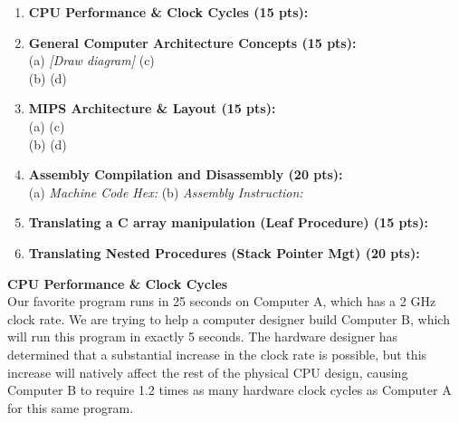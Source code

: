 \documentclass[letterpaper]{report}
\begin{document}
\noindent
\begin{minipage}[t][7in][s]{0.48\textwidth}
\begin{enumerate}[\bf 1.]
    \item \textbf{CPU Performance \& Clock Cycles (15 pts):}
    \vfill
    
    \item \textbf{General Computer Architecture Concepts (15 pts):} \\
    (a) \textit{[Draw diagram]} \hfill (c) \\
    (b) \hfill (d)
    \vfill
    
    \item \textbf{MIPS Architecture \& Layout (15 pts):} \\
    (a) \hfill (c) \\
    (b) \hfill (d)
    \vfill
    
    \item \textbf{Assembly Compilation and Disassembly (20 pts):} \\
    (a) \textit{Machine Code Hex:} \hfill (b) \textit{Assembly Instruction:}
    \vfill
\end{enumerate}
\end{minipage}%
\hfill
\begin{minipage}[t][7in][s]{0.48\textwidth}
\begin{enumerate}[\bf 1.]
\setcounter{enumi}{4}
    \item \textbf{Translating a C array manipulation (Leaf Procedure) (15 pts):}
    \vfill
    
    \item \textbf{Translating Nested Procedures (Stack Pointer Mgt) (20 pts):}
    \vfill
\end{enumerate}
\end{minipage}

\newpage

%
 {\bf CPU Performance \& Clock Cycles} \\
Our favorite program runs in 25 seconds on $\text{Computer A}$, which has a 2 GHz clock rate. We are trying to help a computer designer build $\text{Computer B}$, which will run this program in exactly 5 seconds. The hardware designer has determined that a substantial increase in the clock rate is possible, but this increase will natively affect the rest of the physical CPU design, causing $\text{Computer B}$ to require 1.2 times as many hardware clock cycles as $\text{Computer A}$ for this same program. 
\end{document}
